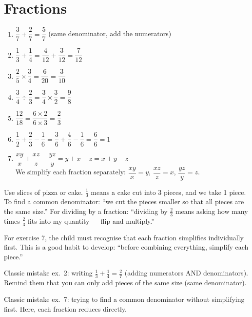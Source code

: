 \documentclass[11pt,a4paper]{article}
\newcommand{\corrbox}[1]{
\begin{tcolorbox}[colback=correctgreen!8!white,colframe=correctgreen!60!black]
#1
\end{tcolorbox}
}
\newcommand{\tipbox}[1]{
\begin{tcolorbox}[colback=tipblue!8!white,colframe=tipblue!60!black,title=\textbf{How to explain}]
#1
\end{tcolorbox}
}
\newcommand{\warnbox}[1]{
\begin{tcolorbox}[colback=warnred!8!white,colframe=warnred!60!black,title=\textbf{Common mistakes}]
#1
\end{tcolorbox}
}
\begin{document}
\section{Fractions}

\corrbox{
\begin{enumerate}
\item $\dfrac{3}{7} + \dfrac{2}{7} = \dfrac{5}{7}$ \quad (same denominator, add the numerators)
\item $\dfrac{1}{3} + \dfrac{1}{4} = \dfrac{4}{12} + \dfrac{3}{12} = \dfrac{7}{12}$
\item $\dfrac{2}{5} \times \dfrac{3}{4} = \dfrac{6}{20} = \dfrac{3}{10}$
\item $\dfrac{3}{4} \div \dfrac{2}{3} = \dfrac{3}{4} \times \dfrac{3}{2} = \dfrac{9}{8}$
\item $\dfrac{12}{18} = \dfrac{6 \times 2}{6 \times 3} = \dfrac{2}{3}$
\item $\dfrac{1}{2} + \dfrac{2}{3} - \dfrac{1}{6} = \dfrac{3}{6} + \dfrac{4}{6} - \dfrac{1}{6} = \dfrac{6}{6} = 1$
\item $\dfrac{xy}{x} + \dfrac{xz}{z} - \dfrac{yz}{y} = y + x - z = x + y - z$\\[0.2cm]
We simplify each fraction separately: $\dfrac{xy}{x} = y$, \; $\dfrac{xz}{z} = x$, \; $\dfrac{yz}{y} = z$.
\end{enumerate}
}

\tipbox{
Use slices of pizza or cake. $\frac{1}{3}$ means a cake cut into 3 pieces, and we take 1 piece. To find a common denominator: ``we cut the pieces smaller so that all pieces are the same size.'' For dividing by a fraction: ``dividing by $\frac{2}{3}$ means asking how many times $\frac{2}{3}$ fits into my quantity --- flip and multiply.''

\vspace{0.2cm}
For exercise 7, the child must recognise that each fraction simplifies individually first. This is a good habit to develop: ``before combining everything, simplify each piece.''
}

\warnbox{
Classic mistake ex.~2: writing $\frac{1}{3} + \frac{1}{4} = \frac{2}{7}$ (adding numerators AND denominators). Remind them that you can only add pieces of the same size (same denominator).

\vspace{0.2cm}
Classic mistake ex.~7: trying to find a common denominator without simplifying first. Here, each fraction reduces directly.
}
\end{document}
